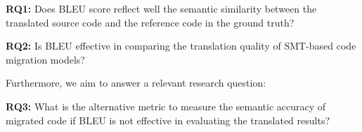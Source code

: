 {\bf RQ1:} Does BLEU score reflect well the semantic similarity between
the translated source code and the reference code in the ground truth?

{\bf RQ2:} Is BLEU effective in comparing the translation quality of SMT-based code migration models?


Furthermore, we aim to answer a relevant research question:

{\bf RQ3:} What is the alternative metric to measure the semantic accuracy
of migrated code if BLEU is not effective in evaluating the translated results?
